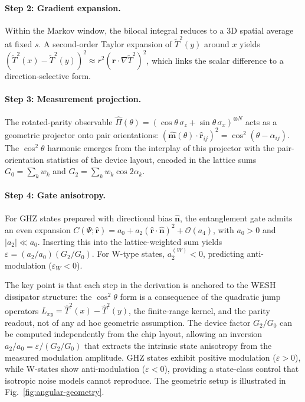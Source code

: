 \documentclass[12pt,a4paper]{article}
\numberwithin{equation}{section}
\begin{document}
\paragraph{Step 2: Gradient expansion.}
Within the Markov window, the bilocal integral reduces to a 3D spatial average at fixed $s$. A second-order Taylor expansion of $\tilde{T}^2(y)$ around $x$ yields $(\tilde{T}^2(x)-\tilde{T}^2(y))^2 \approx r^2(\hat{\mathbf r}\cdot\nabla\tilde{T}^2)^2$, which links the scalar difference to a direction-selective form.

\paragraph{Step 3: Measurement projection.}
The rotated-parity observable $\hat\Pi(\theta) = (\cos\theta\,\sigma_z + \sin\theta\,\sigma_x)^{\otimes N}$ acts as a geometric projector onto pair orientations: $(\hat{\mathbf m}(\theta)\cdot\hat{\mathbf r}_{ij})^2 = \cos^2(\theta - \alpha_{ij})$. The $\cos^2\theta$ harmonic emerges from the interplay of this projector with the pair-orientation statistics of the device layout, encoded in the lattice sums $G_0 = \sum_k w_k$ and $G_2 = \sum_k w_k\cos 2\alpha_k$.

\paragraph{Step 4: Gate anisotropy.}
For GHZ states prepared with directional bias $\hat{\mathbf n}$, the entanglement gate admits an even expansion $C(\Psi;\hat{\mathbf r}) = a_0 + a_2(\hat{\mathbf r}\cdot\hat{\mathbf n})^2 + \mathcal{O}(a_4)$, with $a_0 > 0$ and $|a_2|\ll a_0$. Inserting this into the lattice-weighted sum yields $\varepsilon = (a_2/a_0)(G_2/G_0)$. For W-type states, $a_2^{(W)} < 0$, predicting anti-modulation ($\varepsilon_W < 0$).

\medskip
\noindent The key point is that each step in the derivation is anchored to the WESH dissipator structure: the $\cos^2\theta$ form is a consequence of the quadratic jump operators $L_{xy} = \hat{T}^2(x) - \hat{T}^2(y)$, the finite-range kernel, and the parity readout, not of any ad hoc geometric assumption. The device factor $G_2/G_0$ can be computed independently from the chip layout, allowing an inversion $a_2/a_0 = \varepsilon/(G_2/G_0)$ that extracts the intrinsic state anisotropy from the measured modulation amplitude. GHZ states exhibit positive modulation ($\varepsilon > 0$), while W-states show anti-modulation ($\varepsilon < 0$), providing a state-class control that isotropic noise models cannot reproduce. The geometric setup is illustrated in Fig.~\ref{fig:angular-geometry}.
\vspace{0.3cm}
\end{document}
